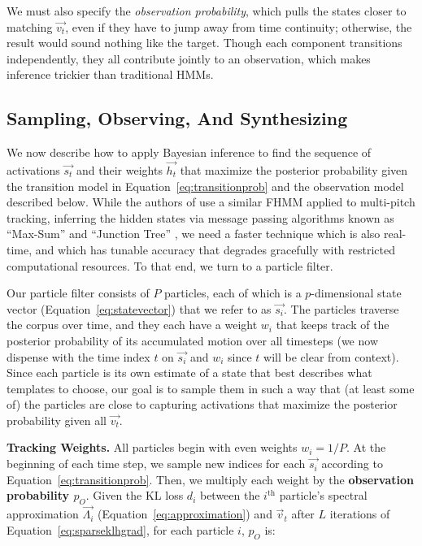 \documentclass{article}
\begin{document}
    We must also specify the {\em observation probability}, which pulls the states closer to matching $\vec{v_t}$, even if they have to jump away from time continuity; otherwise, the result would sound nothing like the target.  Though each component transitions independently, they all contribute jointly to an observation, which makes inference trickier than traditional HMMs.



\subsection{Sampling, Observing, And Synthesizing}
\label{sec:sampling}

We now describe how to apply Bayesian inference to find the sequence of activations $\vec{s_t}$ and their weights $\vec{h_t}$ that maximize the posterior probability given the transition model in Equation~\ref{eq:transitionprob} and the observation model described below.  While the authors of \cite{wohlmayr2010probabilistic} use a similar FHMM applied to multi-pitch tracking, inferring the hidden states via message passing algorithms known as ``Max-Sum'' \cite{kschischang2001factor} and ``Junction Tree'' \cite{jensen1996introduction}, we need a faster technique which is also real-time, and which has tunable accuracy that degrades gracefully with restricted computational resources.  To that end, we turn to a particle filter.

Our particle filter consists of $P$ particles, each of which is a $p$-dimensional state vector (Equation~\ref{eq:statevector}) that we refer to as $\vec{s_i}$.  The particles traverse the corpus over time, and they each have a weight $w_i$ that keeps track of the posterior probability of its accumulated motion over all timesteps (we now dispense with the time index $t$ on $\vec{s_i}$ and $w_i$ since $t$ will be clear from context).  Since each particle is its own estimate of a state that best describes what templates to choose, our goal is to sample them in such a way that (at least some of) the particles are close to capturing activations that maximize the posterior probability given all $\vec{v_t}$.

\textbf{Tracking Weights.} All particles begin with even weights $w_i = 1/P$.  At the beginning of each time step, we sample new indices for each $\vec{s_i}$ according to Equation~\ref{eq:transitionprob}.  Then, we multiply each weight by the \textbf{observation probability $p_O$}.  Given the KL loss $d_i$ between the $i^{\text{th}}$ particle's spectral approximation $\vec{\Lambda_i}$ (Equation~\ref{eq:approximation}) and $\vec{v}_t$ after $L$ iterations of Equation~\ref{eq:sparseklhgrad}, for each particle $i$, $p_O$ is:
\end{document}
